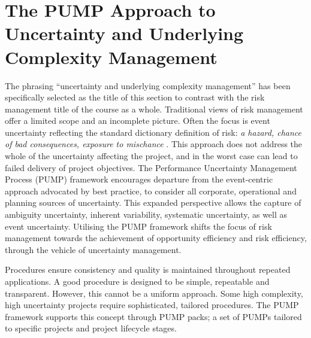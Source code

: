 
\section{The PUMP Approach to Uncertainty and Underlying Complexity Management}


The phrasing ``uncertainty and underlying complexity management'' has been specifically selected as the title of this section to contrast with the risk management title of the course as a whole.
Traditional views of risk management offer a limited scope and an incomplete picture.
Often the focus is event uncertainty reflecting the standard dictionary definition of risk: \textit{a hazard, chance of bad consequences, exposure to mischance} \citep{OED}.
This approach does not address the whole of the uncertainty affecting the project, and in the worst case can lead to failed delivery of project objectives.
The Performance Uncertainty Management Process (PUMP) framework encourages departure from the event-centric approach advocated by best practice, to consider all corporate, operational and planning sources of uncertainty.
This expanded perspective allows the capture of ambiguity uncertainty, inherent variability, systematic uncertainty, as well as event uncertainty.
Utilising the PUMP framework shifts the focus of risk management towards the achievement of opportunity efficiency and risk efficiency, through the vehicle of uncertainty management.

Procedures ensure consistency and quality is maintained throughout repeated applications.
A good procedure is designed to be simple, repeatable and transparent.
However, this cannot be a uniform approach.
Some high complexity, high uncertainty projects require sophisticated, tailored procedures.
The PUMP framework supports this concept through PUMP packs; a set of PUMPs tailored to specific projects and project lifecycle stages.

